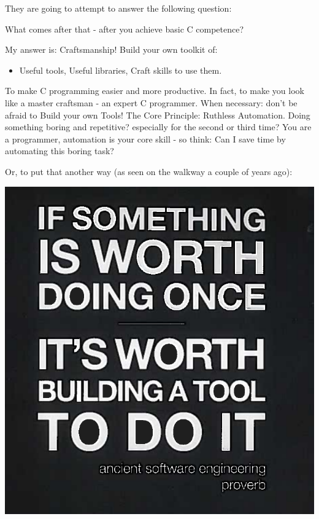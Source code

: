 \documentclass[handout]{beamer}
\begin{document}
\begin{frame}

    \large
    They are going to attempt to answer the following question:
    
    \alert{What comes after that - after you achieve basic C competence?}

    \begin{itemize}
    \pitem
      My answer is: \alert{Craftsmanship!}
    \pitem
      Build your own \alert{toolkit} of:
      \begin{itemize}
      \item
      \alert{Useful tools},
      \pitem
      \alert{Useful libraries},
      \pitem
      \alert{Craft skills} to use them.
      \end{itemize}
    \pitem
      To make C programming easier and more productive.
    \pitem
      In fact, to make you look like a \alert{master craftsman} - an expert C programmer.
    \pitem
      When necessary: don't be afraid to \alert{Build your own Tools!}
    \pitem
      The Core Principle: \alert{Ruthless Automation}.
    \pitem
      Doing something boring and repetitive?
    \pause
      especially for the second or third time?
    \pitem
      You are a \alert{programmer}, automation is your core skill -
      so think:
      \alert{Can I save time by automating this boring task?}
    \end{itemize}
\end{frame}

\begin{frame}
Or, to put that another way (as seen on the walkway a couple of years ago):

\centering
\vspace{10pt}
\includegraphics[height=0.8\textheight]{Build.png}

\end{frame}
\end{document}
